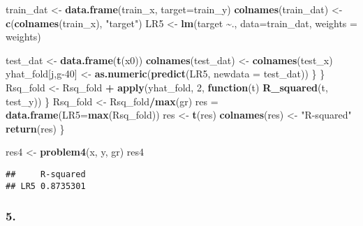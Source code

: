 \documentclass[
]{article}
\newenvironment{Shaded}{\begin{snugshade}}{\end{snugshade}}
\newcommand{\AttributeTok}[1]{\textcolor[rgb]{0.13,0.29,0.53}{#1}}
\newcommand{\ControlFlowTok}[1]{\textcolor[rgb]{0.13,0.29,0.53}{\textbf{#1}}}
\newcommand{\DecValTok}[1]{\textcolor[rgb]{0.00,0.00,0.81}{#1}}
\newcommand{\FunctionTok}[1]{\textcolor[rgb]{0.13,0.29,0.53}{\textbf{#1}}}
\newcommand{\NormalTok}[1]{#1}
\newcommand{\OtherTok}[1]{\textcolor[rgb]{0.56,0.35,0.01}{#1}}
\newcommand{\SpecialCharTok}[1]{\textcolor[rgb]{0.81,0.36,0.00}{\textbf{#1}}}
\newcommand{\StringTok}[1]{\textcolor[rgb]{0.31,0.60,0.02}{#1}}
\begin{document}
\begin{Shaded}
\begin{Highlighting}[]
\NormalTok{        train\_dat }\OtherTok{\textless{}{-}} \FunctionTok{data.frame}\NormalTok{(train\_x, }\AttributeTok{target=}\NormalTok{train\_y)}
        \FunctionTok{colnames}\NormalTok{(train\_dat) }\OtherTok{\textless{}{-}} \FunctionTok{c}\NormalTok{(}\FunctionTok{colnames}\NormalTok{(train\_x), }\StringTok{"target"}\NormalTok{)}
\NormalTok{        LR5 }\OtherTok{\textless{}{-}} \FunctionTok{lm}\NormalTok{(target }\SpecialCharTok{\textasciitilde{}}\NormalTok{., }\AttributeTok{data=}\NormalTok{train\_dat, }\AttributeTok{weights =}\NormalTok{ weights)}
        
\NormalTok{        test\_dat }\OtherTok{\textless{}{-}} \FunctionTok{data.frame}\NormalTok{(}\FunctionTok{t}\NormalTok{(x0))}
        \FunctionTok{colnames}\NormalTok{(test\_dat) }\OtherTok{\textless{}{-}} \FunctionTok{colnames}\NormalTok{(test\_x)}
\NormalTok{        yhat\_fold[j,g}\DecValTok{{-}40}\NormalTok{] }\OtherTok{\textless{}{-}} \FunctionTok{as.numeric}\NormalTok{(}\FunctionTok{predict}\NormalTok{(LR5, }\AttributeTok{newdata =}\NormalTok{ test\_dat))}
\NormalTok{      \}}
\NormalTok{    \}}
\NormalTok{    Rsq\_fold }\OtherTok{\textless{}{-}}\NormalTok{ Rsq\_fold }\SpecialCharTok{+} \FunctionTok{apply}\NormalTok{(yhat\_fold, }\DecValTok{2}\NormalTok{, }\ControlFlowTok{function}\NormalTok{(t) }\FunctionTok{R\_squared}\NormalTok{(t, test\_y))}
\NormalTok{  \}}
\NormalTok{  Rsq\_fold }\OtherTok{\textless{}{-}}\NormalTok{ Rsq\_fold}\SpecialCharTok{/}\FunctionTok{max}\NormalTok{(gr)}
\NormalTok{  res }\OtherTok{=} \FunctionTok{data.frame}\NormalTok{(}\AttributeTok{LR5=}\FunctionTok{max}\NormalTok{(Rsq\_fold))}
\NormalTok{  res }\OtherTok{\textless{}{-}} \FunctionTok{t}\NormalTok{(res)}
  \FunctionTok{colnames}\NormalTok{(res) }\OtherTok{\textless{}{-}} \StringTok{"R{-}squared"}
  \FunctionTok{return}\NormalTok{(res)}
\NormalTok{\}}

\NormalTok{res4 }\OtherTok{\textless{}{-}} \FunctionTok{problem4}\NormalTok{(x, y, gr)}
\NormalTok{res4}
\end{Highlighting}
\end{Shaded}

\begin{verbatim}
##     R-squared
## LR5 0.8735301
\end{verbatim}

\subsubsection{5.}\label{section-4}
\end{document}
